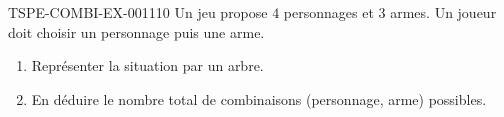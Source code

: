 \begin{exercice}{TSPE-COMBI-EX-001}{1}{10}
Un jeu propose $4$ personnages et $3$ armes. Un joueur doit choisir un personnage puis une arme.
\begin{enumerate}
  \item Représenter la situation par un arbre.
  \item En déduire le nombre total de combinaisons (personnage, arme) possibles.
\end{enumerate}
\end{exercice}
